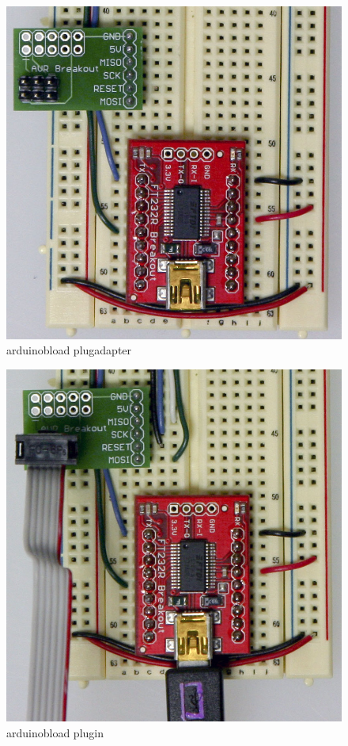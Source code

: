 \begin{figure}[!htb]
 \centering
 \includegraphics[scale=0.3]{img/arduino_breadboard/arduinobload_plugadapter.jpg}
 \caption{arduinobload plugadapter}
 \label{arduinobload plugadapter}
\end{figure}


\begin{figure}[!htb]
 \centering
 \includegraphics[scale=0.3]{img/arduino_breadboard/arduinobload_plugin.jpg}
 \caption{arduinobload plugin}
 \label{arduinobload plugin}
\end{figure}


